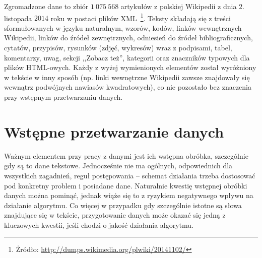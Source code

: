 \documentclass{praca1}
\begin{document}
Zgromadzone dane to zbiór $1\ 075\ 568$ artykułów z polskiej Wikipedii z dnia $2.$ listopada $2014$ roku w postaci plików XML~\footnote{Żródło: \url{http://dumps.wikimedia.org/plwiki/20141102/}}. Teksty składają się z treści sformułowanych w języku naturalnym, wzorów, kodów, linków wewnętrznych Wikipedii, linków do źródeł zewnętrznych, odniesień do źródeł bibliograficznych, cytatów, przypisów, rysunków (zdjęć, wykresów) wraz z podpisami, tabel, komentarzy, uwag, sekcji ,,Zobacz też'', kategorii oraz znaczników typowych dla plików HTML-owych. Każdy z wyżej wymienionych elementów został wyróżniony w tekście w inny sposób (np. linki wewnętrzne Wikipedii zawsze znajdowały się wewnątrz podwójnych nawiasów kwadratowych), co nie pozostało bez znaczenia przy wstępnym przetwarzaniu danych.

\section{Wstępne przetwarzanie danych}

Ważnym elementem przy pracy z danymi jest ich wstępna obróbka, szczególnie gdy są to dane tekstowe. Jednocześnie nie ma ogólnych, odpowiednich dla wszystkich zagadnień, reguł postępowania -- schemat działania trzeba dostosować pod konkretny problem i posiadane dane. Naturalnie kwestię wstępnej obróbki danych można pominąć, jednak wiąże się to z ryzykiem negatywnego wpływu na działanie algorytmu. Co więcej w przypadku gdy szczególnie istotne są słowa znajdujące się w tekście, przygotowanie danych może okazać się jedną z kluczowych kwestii, jeśli chodzi o jakość działania algorytmu.
\end{document}
